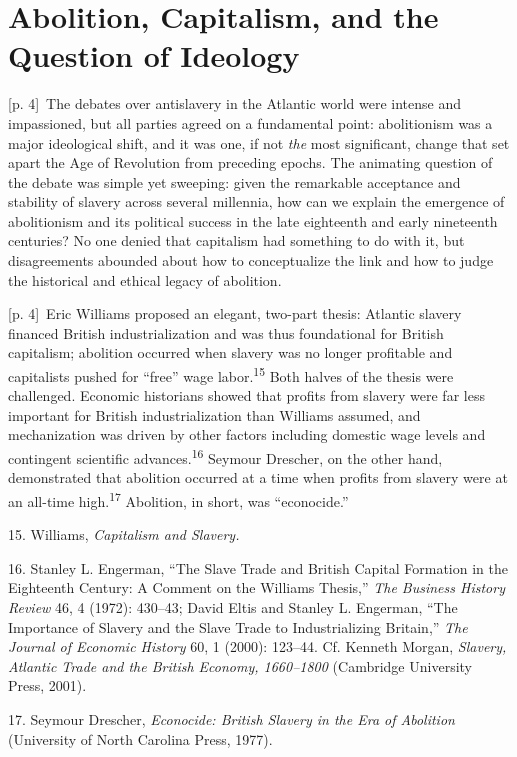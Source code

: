 \documentclass[10pt,a4paper]{article}
\begin{document}
\section*{Abolition, Capitalism, and the Question of Ideology}
{\scriptsize\color{gray} [p. 4]}\ The debates over antislavery in the Atlantic world were intense and impassioned, but all parties agreed on a fundamental point: abolitionism was a major ideological shift, and it was one, if not \textit{the} most significant, change that set apart the Age of Revolution from preceding epochs. The animating question of the debate was simple yet sweeping: given the remarkable acceptance and stability of slavery across several millennia, how can we explain the emergence of abolitionism and its political success in the late eighteenth and early nineteenth centuries? No one denied that capitalism had something to do with it, but disagreements abounded about how to conceptualize the link and how to judge the historical and ethical legacy of abolition.\par
{\scriptsize\color{gray} [p. 4]}\ Eric Williams proposed an elegant, two-part thesis: Atlantic slavery financed British industrialization and was thus foundational for British capitalism; abolition occurred when slavery was no longer profitable and capitalists pushed for “free” wage labor.\nobreak\textsuperscript{15} Both halves of the thesis were challenged. Economic historians showed that profits from slavery were far less important for British industrialization than Williams assumed, and mechanization was driven by other factors including domestic wage levels and contingent scientific advances.\nobreak\textsuperscript{16} Seymour Drescher, on the other hand, demonstrated that abolition occurred at a time when profits from slavery were at an all-time high.\nobreak\textsuperscript{17} Abolition, in short, was “econocide.”\par{\small 15. Williams, \textit{Capitalism and Slavery.}\par}{\small 16. Stanley L. Engerman, “The Slave Trade and British Capital Formation in the Eighteenth Century: A Comment on the Williams Thesis,” \textit{The Business History Review} 46, 4 (1972): 430–43; David Eltis and Stanley L. Engerman, “The Importance of Slavery and the Slave Trade to Industrializing Britain,” \textit{The Journal of Economic History} 60, 1 (2000): 123–44. Cf. Kenneth Morgan, \textit{Slavery, Atlantic Trade and the British Economy, 1660–1800} (Cambridge University Press, 2001).\par}{\small 17. Seymour Drescher, \textit{Econocide: British Slavery in the Era of Abolition} (University of North Carolina Press, 1977).\par}
\end{document}
